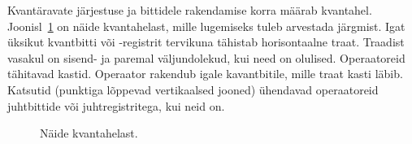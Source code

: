 \documentclass[12pt]{report}
\def\ket#1{\left|#1\right>}
\def\SWAP{\mathop{\rm SWAP}\nolimits}
\begin{document}
\begin{table}[]
    \caption{Töös kasutatud operaatorid, nende definitsioonid maatriksina ja tähistused ahelas.}
    \label{tab:gates}
\end{table}

Kvantäravate järjestuse ja bittidele rakendamise korra määrab kvantahel.
Joonisl~\ref{fig:circuits} on näide kvantahelast, mille lugemiseks tuleb arvestada järgmist.
Igat üksikut kvantbitti või -registrit tervikuna tähistab horisontaalne traat.
Traadist vasakul on sisend- ja paremal väljundolekud, kui need on olulised.
Operaatoreid tähitavad kastid.
Operaator rakendub igale kavantbitile, mille traat kasti läbib.
Katsutid (punktiga lõppevad vertikaalsed jooned) ühendavad operaatoreid juhtbittide või juhtregistritega, kui neid on.

\begin{figure}
    \centering
    \ifdefined\yquanton
    \fi
    \caption{Näide kvantahelast.}
    \label{fig:circuits}
\end{figure}
\end{document}

